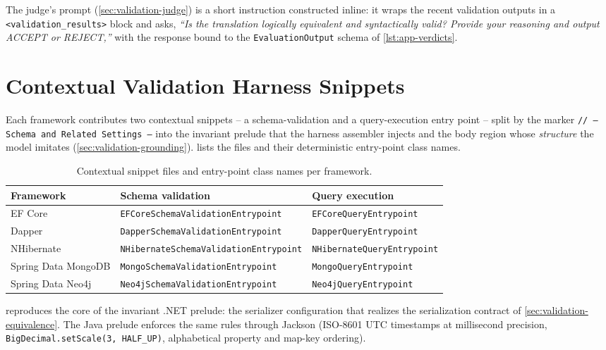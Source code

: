 The judge's prompt (\cref{sec:validation-judge}) is a short instruction constructed
inline: it wraps the recent validation outputs in a \texttt{<validation\_results>}
block and asks, \emph{``Is the translation logically equivalent and syntactically
valid? Provide your reasoning and output ACCEPT or REJECT,''} with the response bound
to the \texttt{EvaluationOutput} schema of \cref{lst:app-verdicts}.

\section{Contextual Validation Harness Snippets}
\label{app:snippets}

Each framework contributes two contextual snippets -- a schema-validation and a
query-execution entry point -- split by the marker
\texttt{// --- Schema and Related Settings ---} into the invariant prelude
that the harness assembler injects and the body region whose \emph{structure} the
model imitates (\cref{sec:validation-grounding}).  lists the
files and their deterministic entry-point class names.

\begin{table}[H]
\centering
\caption{Contextual snippet files and entry-point class names per framework.}
\label{tab:app-snippets}
\small
\begin{tabular}{@{}l l l@{}}
\toprule
\textbf{Framework} & \textbf{Schema validation} & \textbf{Query execution} \\
\midrule
EF Core & \texttt{EFCoreSchemaValidationEntrypoint} & \texttt{EFCoreQueryEntrypoint} \\
Dapper & \texttt{DapperSchemaValidationEntrypoint} & \texttt{DapperQueryEntrypoint} \\
NHibernate & \texttt{NHibernateSchemaValidationEntrypoint} & \texttt{NHibernateQueryEntrypoint} \\
Spring Data MongoDB & \texttt{MongoSchemaValidationEntrypoint} & \texttt{MongoQueryEntrypoint} \\
Spring Data Neo4j & \texttt{Neo4jSchemaValidationEntrypoint} & \texttt{Neo4jQueryEntrypoint} \\
\bottomrule
\end{tabular}
\end{table}

 reproduces the core of the invariant .NET prelude: the
serializer configuration that realizes the serialization contract of
\cref{sec:validation-equivalence}. The Java prelude enforces the same rules through
Jackson (ISO-8601 UTC timestamps at millisecond precision,
\texttt{BigDecimal.setScale(3, HALF\_UP)}, alphabetical property and map-key ordering).

